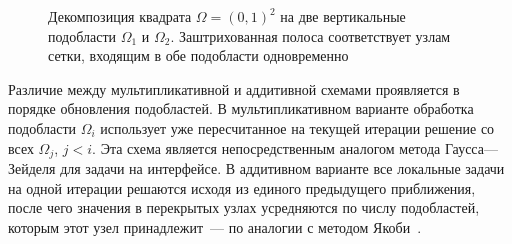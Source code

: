 \begin{figure}[h]
    \centering
    \caption{Декомпозиция квадрата $\Omega = (0,1)^2$ на две вертикальные
    подобласти $\Omega_1$ и $\Omega_2$. Заштрихованная полоса соответствует
    узлам сетки, входящим в обе подобласти одновременно}
    \label{fig:decomposition_2d}
\end{figure}

Различие между мультипликативной и аддитивной схемами проявляется в порядке
обновления подобластей. В мультипликативном варианте обработка подобласти
$\Omega_i$ использует уже пересчитанное на текущей итерации решение со всех
$\Omega_j$, $j<i$. Эта схема является непосредственным аналогом метода
Гаусса---Зейделя для задачи на интерфейсе. В аддитивном варианте все локальные
задачи на одной итерации решаются исходя из единого предыдущего приближения,
после чего значения в перекрытых узлах усредняются по числу подобластей,
которым этот узел принадлежит~--- по аналогии с методом
Якоби~\cite{ortega1991}.

